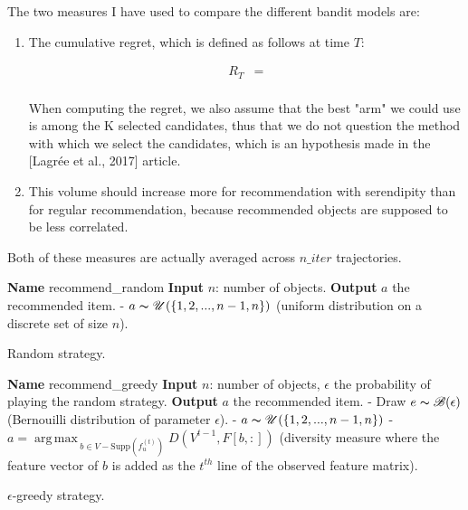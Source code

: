 \documentclass{article}
\DeclareMathOperator*{\argmax}{arg\,max\,}
\begin{document}
The two measures I have used to compare the different bandit models are:
\begin{enumerate}
\item The cumulative regret, which is defined as follows at time $T$:

\begin{equation}
\begin{split}
R_{T} & = \\ 
\end{split}
\end{equation}

When computing the regret, we also assume that the best "arm" we could use is among the K selected candidates, thus that we do not question the method with which we select the candidates, which is an hypothesis made in the [Lagrée et al., 2017] article.

\item 

This volume should increase more for recommendation with serendipity than for regular recommendation, because recommended objects are supposed to be less correlated.

\end{enumerate}

Both of these measures are actually averaged across $n\_iter$ trajectories.


\begin{algorithm}
\begin{algorithmic}
\STATE \textbf{Name} recommend\_random
\STATE \textbf{Input} $n$: number of objects.
\STATE \textbf{Output} $a$ the recommended item.
\STATE - $a \thicksim \mathscr{U}(\{1, 2, ..., n-1, n\})$ (uniform distribution on a discrete set of size $n$).
\end{algorithmic}
\caption{Random strategy.}
\label{random}
\end{algorithm}

\begin{algorithm}
\begin{algorithmic}
\STATE \textbf{Name} recommend\_greedy
\STATE \textbf{Input} $n$: number of objects, $\epsilon$ the probability of playing the random strategy.
\STATE \textbf{Output} $a$ the recommended item.
\STATE - Draw $e \thicksim \mathscr{B}(\epsilon)$ (Bernouilli distribution of parameter $\epsilon$).
\STATE - $a \thicksim \mathscr{U}(\{1, 2, ..., n-1, n\})$
\ELSE
\STATE - $a = \argmax_{b \in V-\text{Supp}(f^{(t)}_{u})} D(V^{t-1}, F[b, :])$ (diversity measure where the feature vector of $b$ is added as the $t^{th}$ line of the observed feature matrix).
\ENDIF
\end{algorithmic}
\caption{$\epsilon$-greedy strategy.}
\label{greedy}
\end{algorithm}
\end{document}
